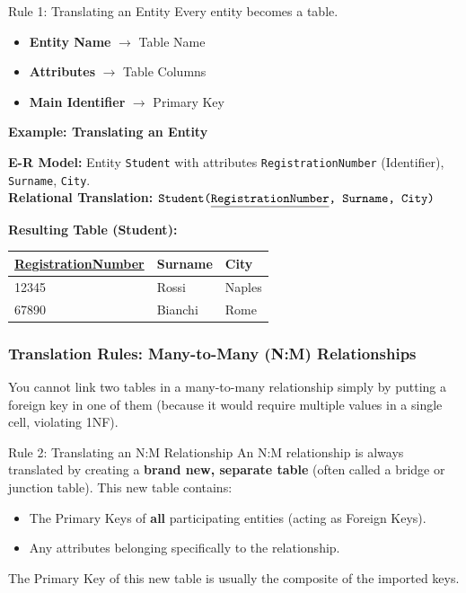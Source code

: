 \vs
\begin{defbox}{Rule 1: Translating an Entity}
Every entity becomes a table. 
\begin{itemize}
    \item \textbf{Entity Name} $\rightarrow$ Table Name
    \item \textbf{Attributes} $\rightarrow$ Table Columns
    \item \textbf{Main Identifier} $\rightarrow$ Primary Key
\end{itemize}
\end{defbox}

\vspace{0.2cm}
\begin{example}{\textbf{Example: Translating an Entity}}

\textbf{E-R Model:} Entity \texttt{Student} with attributes \texttt{RegistrationNumber} (Identifier), \texttt{Surname}, \texttt{City}.\\
\textbf{Relational Translation:} $\texttt{Student(\underline{RegistrationNumber}, Surname, City)}$

\vs
\textbf{Resulting Table (Student):}
\begin{center}
\begin{tabular}{|l|l|l|}
\hline
\textbf{\underline{RegistrationNumber}} & \textbf{Surname} & \textbf{City} \\
\hline
12345 & Rossi & Naples \\
67890 & Bianchi & Rome \\
\hline
\end{tabular}
\end{center}
\end{example}

\subsubsection{Translation Rules: Many-to-Many (N:M) Relationships}
You cannot link two tables in a many-to-many relationship simply by putting a foreign key in one of them (because it would require multiple values in a single cell, violating 1NF). 

\vs
\begin{defbox}{Rule 2: Translating an N:M Relationship}
An N:M relationship is always translated by creating a \textbf{brand new, separate table} (often called a bridge or junction table). This new table contains:
\begin{itemize}
    \item The Primary Keys of \textbf{all} participating entities (acting as Foreign Keys).
    \item Any attributes belonging specifically to the relationship.
\end{itemize}
The Primary Key of this new table is usually the composite of the imported keys.
\end{defbox}

